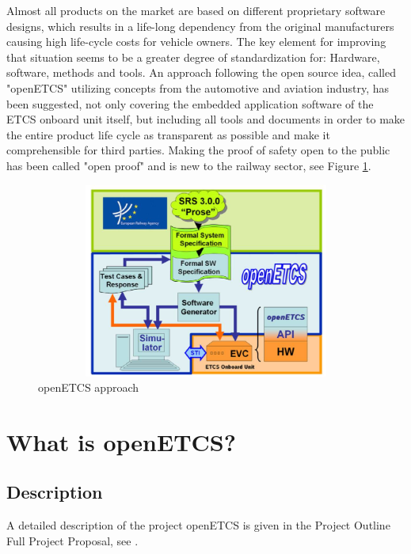 \documentclass{template/openetcs_report}
\begin{document}
Almost all products on the market are based on different proprietary software designs, which results in a life-long dependency from the original manufacturers causing high life-cycle costs for vehicle owners. The key element for improving that situation seems to be a greater degree of standardization for: Hardware, software, methods and tools.
An approach following the open source idea, called "openETCS" utilizing concepts from the automotive and
aviation industry, has been suggested, not only covering the embedded application software of the ETCS onboard unit itself, but including all tools and documents in order to make the entire product life cycle as transparent as possible and make it comprehensible for third parties.
Making the proof of safety open to the public has been called "open proof" and is new to the railway sector, see Figure \ref{fig:openETCS4}.

\begin{figure}[h]
\centering
\includegraphics[width=1.0\textwidth, height=242px]{openETCS4}
\caption{openETCS approach}
\label{fig:openETCS4}
\end{figure}


\chapter{What is openETCS?}

\section{Description}
A detailed description of the project openETCS is given in the Project Outline Full Project
Proposal, see \cite{FPP13}.
\end{document}
